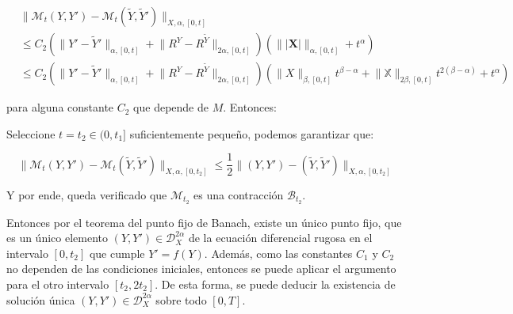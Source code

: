 \begin{itemize}

	\begin{align*}
		&\lVert \mathcal{M}_t (Y, Y') - \mathcal{M}_t (\tilde{Y}, \tilde{Y}')  \rVert_{X, \alpha, [0,t]} \\
		&\leq C_2 ( \lVert Y' - \tilde{Y}' \rVert_{\alpha, [0,t]} + \lVert R^Y - R^{\tilde{Y}} \rVert_{2\alpha, [0,t]} ) ( \lVert \lvert \mathbf{X} \rvert \rVert_{\alpha, [0,t]} + t^{\alpha} ) \\
		&\leq C_2 ( \lVert Y' - \tilde{Y}' \rVert_{\alpha, [0,t]} + \lVert R^Y - R^{\tilde{Y}} \rVert_{2\alpha, [0,t]} ) ( \lVert X \rVert_{\beta, [0,t]} t^{\beta - \alpha} + \lVert \mathbb{X} \rVert_{2\beta, [0,t]} t^{2(\beta - \alpha)} + t^{\alpha} )
	\end{align*}

	para alguna constante $C_2$ que depende de $M$. Entonces:

	\begin{comment}
	\begin{align*}
		&\lVert \mathcal{M}_t (Y, Y') - \mathcal{M}_t (\tilde{Y}, \tilde{Y}')  \rVert_{X, \alpha, [0,t]} \\
		&\leq C_2 ( \lVert Y' - \tilde{Y}' \rVert_{\alpha, [0,t]} + \lVert R^Y - R^{\tilde{Y}} \rVert_{2\alpha, [0,t]} ) ( \lVert X \rVert_{\beta, [0,t]} t^{\beta - \alpha} + \lVert \mathbb{X} \rVert_{2\beta, [0,t]} t^{2(\beta - \alpha)} + t^{\alpha} )
	\end{align*}
	\end{comment}
	
	Seleccione $t = t_2 \in (0, t_1]$ suficientemente pequeño, podemos garantizar que:

	\[
		\lVert \mathcal{M}_t (Y, Y') - \mathcal{M}_t (\tilde{Y}, \tilde{Y}')  \rVert_{X, \alpha, [0,t_2]} \leq \frac{1}{2} \lVert (Y, Y') - (\tilde{Y}, \tilde{Y}') \rVert_{X, \alpha, [0,t_2]}
	\]

	Y por ende, queda verificado que $\mathcal{M}_{t_2}$ es una contracción $\mathcal{B}_{t_2}$.

\end{itemize}

Entonces por el teorema del punto fijo de Banach, existe un único punto fijo, que es un único elemento $(Y, Y') \in \mathscr{D}^{2\alpha}_X$ de la ecuación diferencial rugosa en el intervalo $[0, t_2]$ que cumple $Y' = f(Y)$. Además, como las constantes $C_1$ y $C_2$ no dependen de las condiciones iniciales, entonces se puede aplicar el argumento para el otro intervalo $[t_2, 2t_2]$. De esta forma, se puede deducir la existencia de solución única $(Y, Y') \in \mathscr{D}^{2\alpha}_X$ sobre todo $[0,T]$. \\

